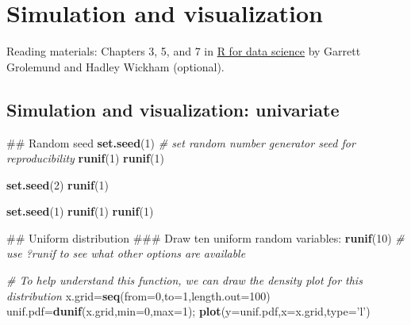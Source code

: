 \documentclass[12pt,]{book}
\newenvironment{Shaded}{\begin{snugshade}}{\end{snugshade}}
\newcommand{\KeywordTok}[1]{\textcolor[rgb]{0.13,0.29,0.53}{\textbf{#1}}}
\newcommand{\DataTypeTok}[1]{\textcolor[rgb]{0.13,0.29,0.53}{#1}}
\newcommand{\DecValTok}[1]{\textcolor[rgb]{0.00,0.00,0.81}{#1}}
\newcommand{\StringTok}[1]{\textcolor[rgb]{0.31,0.60,0.02}{#1}}
\newcommand{\CommentTok}[1]{\textcolor[rgb]{0.56,0.35,0.01}{\textit{#1}}}
\newcommand{\NormalTok}[1]{#1}
\begin{document}
\chapter{Simulation and visualization}\label{ch:sim}

Reading materials: Chapters 3, 5, and 7 in
\href{https://r4ds.had.co.nz/index.html}{R for data science} by Garrett
Grolemund and Hadley Wickham (optional).

\section{Simulation and visualization:
univariate}\label{simulation-and-visualization-univariate}

\begin{Shaded}
\begin{Highlighting}[]
\NormalTok{## Random seed}
\KeywordTok{set.seed}\NormalTok{(}\DecValTok{1}\NormalTok{) }\CommentTok{# set random number generator seed for reproducibility}
\KeywordTok{runif}\NormalTok{(}\DecValTok{1}\NormalTok{)}
\KeywordTok{runif}\NormalTok{(}\DecValTok{1}\NormalTok{) }

\KeywordTok{set.seed}\NormalTok{(}\DecValTok{2}\NormalTok{)}
\KeywordTok{runif}\NormalTok{(}\DecValTok{1}\NormalTok{)}

\KeywordTok{set.seed}\NormalTok{(}\DecValTok{1}\NormalTok{)}
\KeywordTok{runif}\NormalTok{(}\DecValTok{1}\NormalTok{)}
\KeywordTok{runif}\NormalTok{(}\DecValTok{1}\NormalTok{)}
\end{Highlighting}
\end{Shaded}

\begin{Shaded}
\begin{Highlighting}[]
\NormalTok{## Uniform distribution}
\NormalTok{### Draw ten uniform random variables:}
\KeywordTok{runif}\NormalTok{(}\DecValTok{10}\NormalTok{)}
\CommentTok{# use ?runif to see what other options are available }

\CommentTok{# To help understand this function, we can draw the density plot for this distribution}
\NormalTok{x.grid=}\KeywordTok{seq}\NormalTok{(}\DataTypeTok{from=}\DecValTok{0}\NormalTok{,}\DataTypeTok{to=}\DecValTok{1}\NormalTok{,}\DataTypeTok{length.out=}\DecValTok{100}\NormalTok{)}
\NormalTok{unif.pdf=}\KeywordTok{dunif}\NormalTok{(x.grid,}\DataTypeTok{min=}\DecValTok{0}\NormalTok{,}\DataTypeTok{max=}\DecValTok{1}\NormalTok{);}
\KeywordTok{plot}\NormalTok{(}\DataTypeTok{y=}\NormalTok{unif.pdf,}\DataTypeTok{x=}\NormalTok{x.grid,}\DataTypeTok{type=}\StringTok{'l'}\NormalTok{)}
\end{Highlighting}
\end{Shaded}
\end{document}
